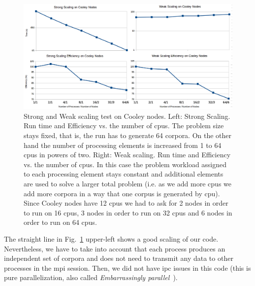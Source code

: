 \documentclass[11pt,a4paper]{article}
\begin{document}
\begin{figure}[h!]
    \centering
    \includegraphics[width=1.0\textwidth]{CorporaGenerationScaling.png}
    \caption{Strong and Weak scaling test on Cooley nodes. Left: Strong Scaling. Run time and Efficiency vs. the number of \glspl{cpu}. The problem size stays fixed, that is, the run has to generate 64 corpora. On the other hand the number of processing elements is increased from 1 to 64 \glspl{cpu} in powers of two. Right: Weak scaling. Run time and Efficiency vs. the number of \glspl{cpu}. In this case the problem workload assigned to each processing element stays constant and additional elements are used to solve a larger total problem (i.e. as we add more \glspl{cpu} we add more corpora in a way that one corpus is generated by \gls{cpu}). Since Cooley nodes have 12 \glspl{cpu} we had to ask for 2 nodes in order to run on 16 \glspl{cpu}, 3 nodes in order to run on 32 \glspl{cpu} and 6 nodes in order to run on 64 \glspl{cpu}.}
    \label{fig:CorporaGenerationScaling}
\end{figure}


The straight line in Fig.~\ref{fig:CorporaGenerationScaling} upper-left shows a good scaling of our code. Nevertheless, we have to take into account that each process produces an independent set of corpora and does not need to transmit any data to other processes in the \gls{mpi} session. Then, we did not have \gls{ipc} issues in this code (this is pure parallelization, also called \emph{Embarrassingly parallel}~\cite{noauthor_embarrassingly_2018}).
\end{document}
